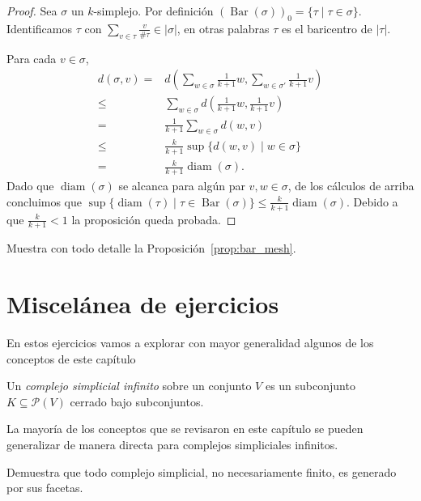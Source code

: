 \documentclass{standalone}
\begin{document}
	\begin{proof}
		Sea $\sigma$ un $k$-simplejo. Por definición $(\operatorname{Bar}(\sigma))_{0}=\{\tau\mid\tau\in \sigma\}$. Identificamos $\tau$ con $\sum_{v\in\tau}\frac{v}{\#\tau}\in|\sigma|$, en otras palabras $\tau$ es el baricentro de $|\tau|$.
		
		Para cada $v\in \sigma$, \begin{align}
			d(\sigma,v)=&d(\sum_{w\in\sigma}\frac{1}{k+1}w,\sum_{w\in\sigma'}\frac{1}{k+1}v)\\
			\leq& \sum_{w\in\sigma}d(\frac{1}{k+1}w,\frac{1}{k+1}v)\\
			=&\frac{1}{k+1}\sum_{w\in\sigma}d(w,v)\\
			\leq&\frac{k}{k+1}\sup\{d(w,v)\mid w\in\sigma\}\\
			=&\frac{k}{k+1}\operatorname{diam}(\sigma).		
		\end{align}
		Dado que $\operatorname{diam}(\sigma)$ se alcanca para algún par $v,w\in\sigma$, de los cálculos de arriba concluimos que $\sup\{\operatorname{diam}(\tau)\mid\tau\in\operatorname{Bar}(\sigma)\}\leq\frac{k}{k+1}\operatorname{diam}(\sigma)$. Debido a que $\frac{k}{k+1}<1$ la proposición queda probada.
	\end{proof}
	\begin{exercise}
		Muestra con todo detalle la Proposición~\ref{prop:bar_mesh}.
	\end{exercise}
	
	\section{Miscelánea de ejercicios}
	
	En estos ejercicios vamos a explorar con mayor generalidad algunos de los conceptos de este capítulo
	
	\begin{definition}\label{def:infinite_simplicial_complex}
		Un \emph{complejo simplicial infinito} sobre un conjunto $V$ es un subconjunto $K\subseteq\mathcal{P}(V)$ cerrado bajo subconjuntos.
	\end{definition}
	
	La mayoría de los conceptos que se revisaron en este capítulo se pueden generalizar de manera directa para complejos simpliciales infinitos.
	
	\begin{exercise}
		Demuestra que todo complejo simplicial, no necesariamente finito, es generado por sus facetas.
	\end{exercise}
	
\end{document}
